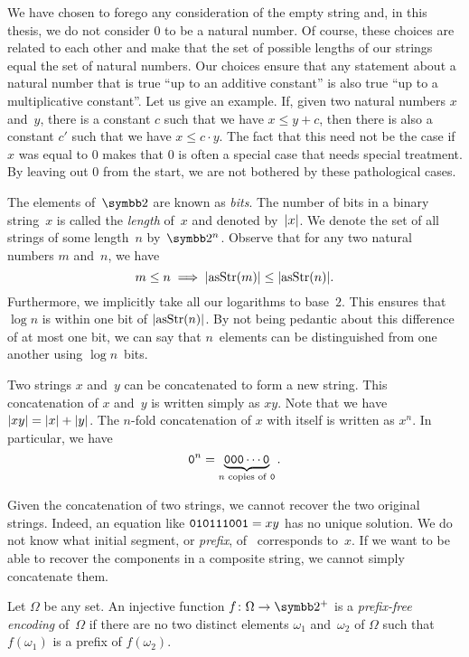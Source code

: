 We have chosen to forego any consideration of the empty string and, in this thesis, we do not consider $0$ to be a natural number.
Of course, these choices are related to each other and make that the set of possible lengths of our strings equal the set of natural numbers.
Our choices ensure that any statement about a natural number that is true \enquote{up to an additive constant} is also true \enquote{up to a multiplicative constant}.
Let us give an example.
If, given two natural numbers $x$ and~$y$, there is a constant $c$ such that we have $x \le y + c$, then there is also a constant $c'$ such that we have $x \le c \cdot y$.
The fact that this need not be the case if $x$ was equal to $0$ makes that $0$ is often a special case that needs special treatment.
By leaving out $0$ from the start, we are not bothered by these pathological cases.

The elements of~$\binary$ are known as \emph{bits}.
The number of bits in a binary string~$x$ is called the \emph{length} of~$x$ and denoted by~${\lvert x\rvert}$.
We denote the set of all strings of some length~$n$ by~$\binary^n$.
Observe that for any two natural numbers $m$ and~$n$, we have
\begin{equation*}
  m \le n \implies {\lvert\operatorname{asStr}(m)\rvert} \le {\lvert\operatorname{asStr}(n)\rvert}.
\end{equation*}
Furthermore, we implicitly take all our logarithms to base~$2$.
This ensures that $\log n$ is within one bit of ${\lvert\operatorname{asStr}(n)\rvert}$.
By not being pedantic about this difference of at most one bit, we can say that $n$~elements can be distinguished from one another using $\log n$~bits.

Two strings $x$ and~$y$ can be concatenated to form a new string.
This concatenation of $x$ and~$y$ is written simply as $xy$.
Note that we have ${\lvert xy\rvert} = {\lvert x\rvert} + {\lvert y\rvert}$.
The $n$-fold concatenation of $x$ with itself is written as $x^n$.
In particular, we have
\begin{equation*}
  \textnormal{\texttt{0}}^n = \underbrace{\textnormal{\texttt{000}}\cdots\textnormal{\texttt{0}}}_{\text{$n$ copies of \textnormal{\texttt{0}}}}.
\end{equation*}

Given the concatenation of two strings, we cannot recover the two original strings.
Indeed, an equation like $\textnormal{\texttt{010111001}} = xy$ has no unique solution.
We do not know what initial segment, or \emph{prefix}, of~ corresponds to~$x$.
If we want to be able to recover the components in a composite string, we cannot simply concatenate them.
\begin{definition}
  Let $\Omega$ be any set.
  An injective function $f\colon \Omega \to \binary^+$ is a \emph{prefix-free encoding} of~$\Omega$ if there are no two distinct elements $\omega_1$ and~$\omega_2$ of $\Omega$ such that $f(\omega_1)$ is a prefix of $f(\omega_2)$.
\end{definition}

